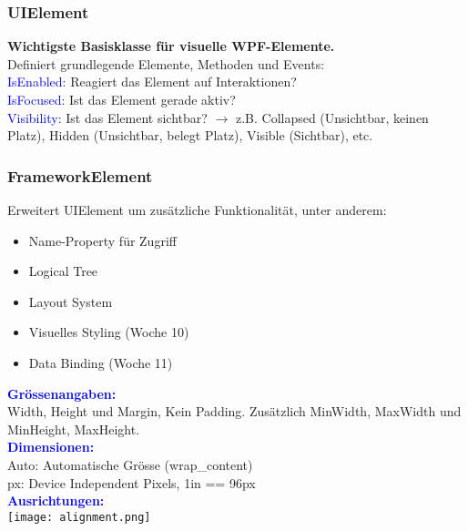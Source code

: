 \subsubsection{UIElement}
\textbf{Wichtigste Basisklasse für visuelle WPF-Elemente.}\\
Definiert grundlegende Elemente, Methoden und Events:\\
\textcolor{blue}{IsEnabled:} Reagiert das Element auf Interaktionen?\\
\textcolor{blue}{IsFocused:} Ist das Element gerade aktiv?\\
\textcolor{blue}{Visibility:} Ist das Element sichtbar? $\rightarrow$ z.B. Collapsed (Unsichtbar, keinen Platz), Hidden (Unsichtbar, belegt Platz), Visible (Sichtbar), etc.
\subsubsection{FrameworkElement}
Erweitert UIElement um zusätzliche Funktionalität, unter anderem:
\begin{itemize}[topsep=0pt, leftmargin=4mm]
    \setlength\itemsep{-0.3em}
    \item Name-Property für Zugriff
    \item Logical Tree
    \item Layout System
    \item Visuelles Styling (Woche 10)
    \item Data Binding (Woche 11)
\end{itemize}
\textbf{\textcolor{blue}{Grössenangaben:}}\\
Width, Height und Margin, Kein Padding. Zusätzlich MinWidth, MaxWidth und MinHeight, MaxHeight.\\
\textbf{\textcolor{blue}{Dimensionen:}}\\
Auto: Automatische Grösse (wrap\_content)\\
px: Device Independent Pixels, 1in == 96px\\
\textbf{\textcolor{blue}{Ausrichtungen:}}\\
\texttt{[image: alignment.png]}
